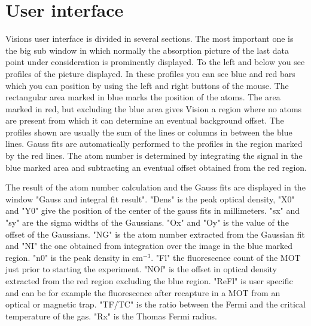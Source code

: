 \documentclass[10pt]{article}
\begin{document}
\section{User interface}

Visions user interface is divided in several sections. The most
important one is the big sub window in which normally the
absorption picture of the last data point under consideration is
prominently displayed. To the left and below you see profiles of
the picture displayed. In these profiles you can see blue and red
bars which you can position by using the left and right buttons of
the mouse. The rectangular area marked in blue marks the position
of the atoms. The area marked in red, but excluding the blue area
gives Vision a region where no atoms are present from which it can
determine an eventual background offset. The profiles shown are
usually the sum of the lines or columns in between the blue lines.
Gauss fits are automatically performed to the profiles in the
region marked by the red lines. The atom number is determined by
integrating the signal in the blue marked area and subtracting an
eventual offset obtained from the red region.

The result of the atom number calculation and the Gauss fits are
displayed in the window "Gauss and integral fit result". "Dens" is
the peak optical density, "X0" and "Y0" give the position of the
center of the gauss fits in millimeters. "sx" and "sy" are the
sigma widths of the Gaussians. "Ox" and "Oy" is the value of the
offset of the Gaussians. "NG" is the atom number extracted from
the Gaussian fit and "NI" the one obtained from integration over
the image in the blue marked region. "n0" is the peak density in
cm$^{-3}$. "Fl" the fluorescence count of the MOT just prior to
starting the experiment. "NOf" is the offset in optical density
extracted from the red region excluding the blue region. "ReFl" is
user specific and can be for example the fluorescence after
recapture in a MOT from an optical or magnetic trap. "TF/TC" is
the ratio between the Fermi and the critical temperature of the
gas. "Rx" is the Thomas Fermi radius.
\end{document}
